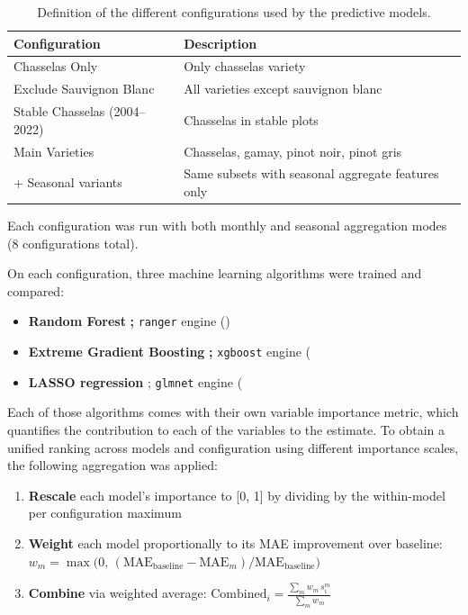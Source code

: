 \begin{table}[tbp]
\centering
\caption{Definition of the different configurations used by the predictive models.}\label{tab:configs}
\begin{tabular}{@{}l l@{}}
\toprule
\textbf{Configuration} & \textbf{Description} \\
\midrule
Chasselas Only & Only chasselas variety \\
Exclude Sauvignon Blanc & All varieties except sauvignon blanc \\
Stable Chasselas (2004--2022) & Chasselas in stable plots \\
Main Varieties & Chasselas, gamay, pinot noir, pinot gris \\
+ Seasonal variants & Same subsets with seasonal aggregate features only \\
\bottomrule
\end{tabular}
\end{table}

Each configuration was run with both monthly and seasonal aggregation modes (8 configurations total).

On each configuration, three machine learning algorithms were trained and compared:

\begin{itemize}
\tightlist
\item
  \textbf{Random Forest} \citep{breiman_random_2001}\textbf{;} \texttt{ranger} engine (\citealp{wright_ranger_2017})
\item
  \textbf{Extreme Gradient Boosting} \citep{chen_xgboost_2016}\textbf{;} \texttt{xgboost} engine (\citealp{chen_tianqi_xgboost_2026}
\item
  \textbf{LASSO regression} \citep{tibshirani_regression_1996}; \texttt{glmnet} engine (\citealp{friedman_regularization_2010}
\end{itemize}

Each of those algorithms comes with their own variable importance metric, which quantifies the contribution to each of the variables to the estimate. To obtain a unified ranking across models and configuration using different importance scales, the following aggregation was applied:

\begin{enumerate}
\def\labelenumi{\arabic{enumi}.}
\tightlist
\item
  \textbf{Rescale} each model's importance to {[}0, 1{]} by dividing by the within-model per configuration maximum
\item
  \textbf{Weight} each model proportionally to its MAE improvement over baseline:\\
  \(w_{m} = \max\bigl(0,\,(\text{MAE}_{\text{baseline}} - \text{MAE}_{m})/\text{MAE}_{\text{baseline}})\)
\item
  \textbf{Combine} via weighted average: \(\text{Combined}_{i} = \frac{\sum_{m}^{}w_{m}\, s_{i}^{m}}{\sum_{m}^{}w_{m}}\)
\end{enumerate}

